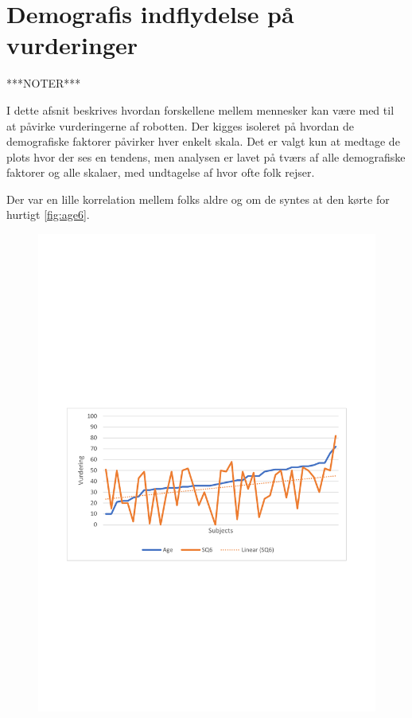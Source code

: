 \section{Demografis indflydelse på vurderinger}
\label{sec:Demografi}
%
***NOTER***

I dette afsnit beskrives hvordan forskellene mellem mennesker kan være med til at påvirke vurderingerne af robotten. Der kigges isoleret på hvordan de demografiske faktorer påvirker hver enkelt skala. Det er valgt kun at medtage de plots hvor der ses en tendens, men analysen er lavet på tværs af alle demografiske faktorer og alle skalaer, med undtagelse af hvor ofte folk rejser.


Der var en lille korrelation mellem folks aldre og om de syntes at den kørte for hurtigt \autoref{fig:age6}.

\begin{figure}[H]
\centering
\includegraphics[width=\textwidth]{Figure/DatabehandlingSkalaer/Demografi/age6.pdf}
\caption{}
\label{fig:age6}
\end{figure}
\noindent

